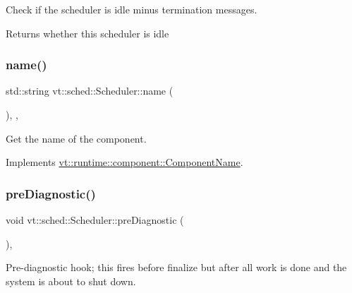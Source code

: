 Check if the scheduler is idle minus termination messages. 

\begin{DoxyReturn}{Returns}
whether this scheduler is idle 
\end{DoxyReturn}
\mbox{\label{structvt_1_1sched_1_1_scheduler_a60d76cb810df35be76d414226c24d6c4}} 
\subsubsection{\texorpdfstring{name()}{name()}}
{\footnotesize\ttfamily std\+::string vt\+::sched\+::\+Scheduler\+::name (\begin{DoxyParamCaption}{ }\end{DoxyParamCaption})\hspace{0.3cm}{\ttfamily [inline]}, {\ttfamily [override]}, {\ttfamily [virtual]}}



Get the name of the component. 



Implements \hyperlink{structvt_1_1runtime_1_1component_1_1_component_name_a33c06229bb605a2b2ceff68830d6d773}{vt\+::runtime\+::component\+::\+Component\+Name}.

\mbox{\label{structvt_1_1sched_1_1_scheduler_a42835a58f541dd65cecd4d393fe78a81}} 
\subsubsection{\texorpdfstring{pre\+Diagnostic()}{preDiagnostic()}}
{\footnotesize\ttfamily void vt\+::sched\+::\+Scheduler\+::pre\+Diagnostic (\begin{DoxyParamCaption}{ }\end{DoxyParamCaption})\hspace{0.3cm}{\ttfamily [override]}, {\ttfamily [virtual]}}



Pre-\/diagnostic hook; this fires before finalize but after all work is done and the system is about to shut down. 

